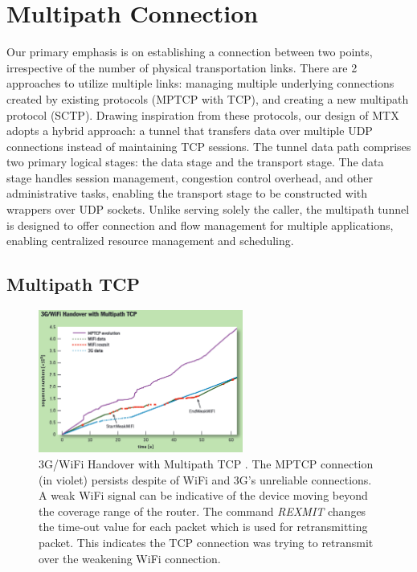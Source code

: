 \section{Multipath Connection}\label{sec:related_work:mp_connection}
Our primary emphasis is on establishing a connection between two points, irrespective of the number of physical transportation links.
There are 2 approaches to utilize multiple links: managing multiple underlying connections created by existing protocols (\ac{MPTCP} with TCP), and creating a new multipath protocol (\ac{SCTP}).
Drawing inspiration from these protocols, our design of \ac{MTX} adopts a hybrid approach: a tunnel that transfers data over multiple UDP connections instead of maintaining TCP sessions. 
The tunnel data path comprises two primary logical stages: the data stage and the transport stage. 
The data stage handles session management, congestion control overhead, and other administrative tasks, enabling the transport stage to be constructed with wrappers over UDP sockets.
Unlike serving solely the caller, the multipath tunnel is designed to offer connection and flow management for multiple applications, enabling centralized resource management and scheduling.

\subsection{Multipath TCP}\label{sec:related_work:mp_connection:MPTCP}
\begin{figure}[H]
	\centering
	\includegraphics[width=0.6\textwidth]{resources/images/3G_WiFi_Handover_with_Multipath_TCP.PNG}
	\caption{3G/WiFi Handover with Multipath TCP \cite{paasch_multipath_2014}. The MPTCP connection (in violet) persists despite of WiFi and 3G's unreliable connections. A weak WiFi signal can be indicative of the device moving beyond the coverage range of the router. The command \textit{REXMIT} changes the time-out value for each packet which is used for retransmitting packet. This indicates the TCP connection was trying to retransmit over the weakening WiFi connection.}
    \label{fig:related_work:3G_WiFi_Handover_with_Multipath_TCP}
\end{figure}

